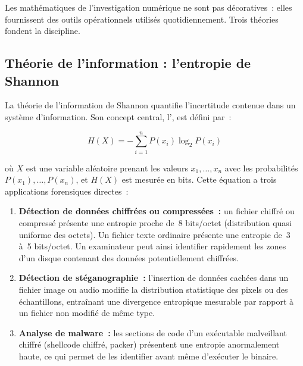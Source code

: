 Les mathématiques de l'investigation numérique ne sont pas décoratives~:
elles fournissent des outils opérationnels utilisés quotidiennement.
Trois théories fondent la discipline.

\subsection{Théorie de l'information : l'entropie de Shannon}
\label{subsec:shannon}

La théorie de l'information de Shannon \cite{shannon1948} quantifie
l'incertitude contenue dans un système d'information. Son concept central,
l', est
défini par~:

\begin{equation}
H(X) = -\sum_{i=1}^{n} P(x_i) \log_2 P(x_i)
\label{eq:shannon}
\end{equation}

où $X$ est une variable aléatoire prenant les valeurs $x_1, \ldots, x_n$
avec les probabilités $P(x_1), \ldots, P(x_n)$, et $H(X)$ est mesurée
en bits. Cette équation a trois applications forensiques directes~:

\begin{enumerate}
    \item \textbf{Détection de données chiffrées ou compressées~:}
          un fichier chiffré ou compressé présente une entropie proche de~8
          bits/octet (distribution quasi uniforme des octets). Un fichier texte
          ordinaire présente une entropie de~3 à~5 bits/octet. Un examinateur
          peut ainsi identifier rapidement les zones d'un disque contenant
          des données potentiellement chiffrées.

    \item \textbf{Détection de stéganographie~:} l'insertion de données cachées
          dans un fichier image ou audio modifie la distribution statistique
          des pixels ou des échantillons, entraînant une divergence entropique
          mesurable par rapport à un fichier non modifié de même type.

    \item \textbf{Analyse de malware~:} les sections de code d'un exécutable
          malveillant chiffré (shellcode chiffré, packer) présentent une
          entropie anormalement haute, ce qui permet de les identifier avant
          même d'exécuter le binaire.
\end{enumerate}

